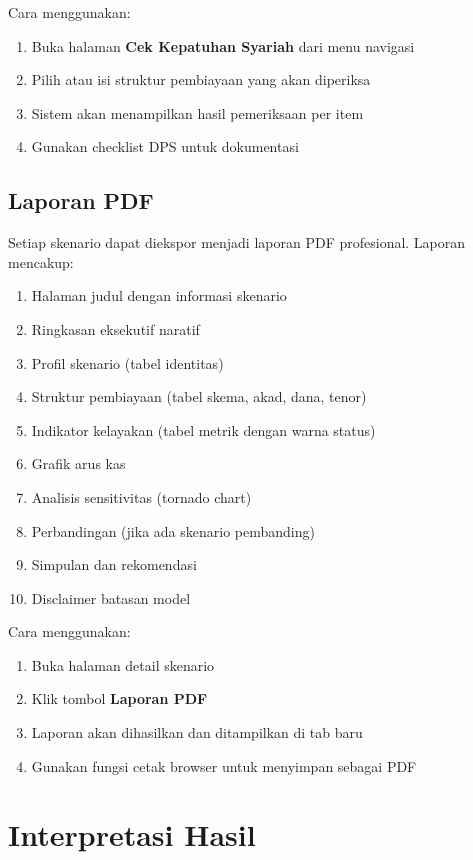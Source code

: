 \documentclass[12pt,a4paper,twoside]{report}
\begin{document}
Cara menggunakan:
\begin{enumerate}
  \item Buka halaman \textbf{Cek Kepatuhan Syariah} dari menu navigasi
  \item Pilih atau isi struktur pembiayaan yang akan diperiksa
  \item Sistem akan menampilkan hasil pemeriksaan per item
  \item Gunakan checklist DPS untuk dokumentasi
\end{enumerate}

\section{Laporan PDF}

Setiap skenario dapat diekspor menjadi laporan PDF profesional. Laporan mencakup:
\begin{enumerate}
  \item Halaman judul dengan informasi skenario
  \item Ringkasan eksekutif naratif
  \item Profil skenario (tabel identitas)
  \item Struktur pembiayaan (tabel skema, akad, dana, tenor)
  \item Indikator kelayakan (tabel metrik dengan warna status)
  \item Grafik arus kas
  \item Analisis sensitivitas (tornado chart)
  \item Perbandingan (jika ada skenario pembanding)
  \item Simpulan dan rekomendasi
  \item Disclaimer batasan model
\end{enumerate}

Cara menggunakan:
\begin{enumerate}
  \item Buka halaman detail skenario
  \item Klik tombol \textbf{Laporan PDF}
  \item Laporan akan dihasilkan dan ditampilkan di tab baru
  \item Gunakan fungsi cetak browser untuk menyimpan sebagai PDF
\end{enumerate}

\chapter{Interpretasi Hasil}
\end{document}
